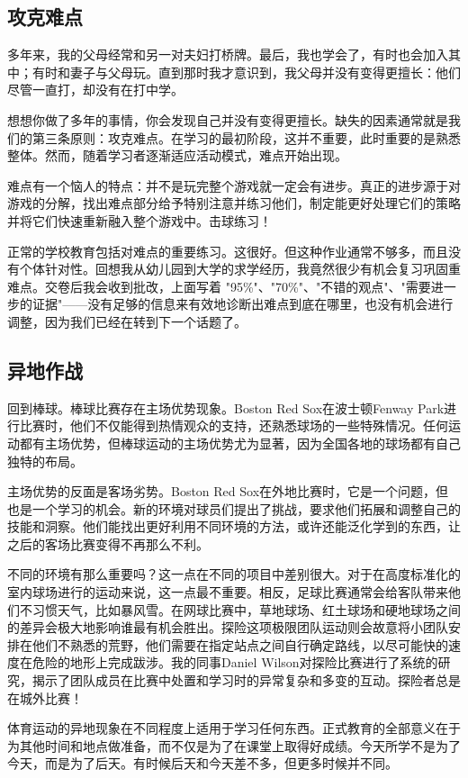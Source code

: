 \subsection*{攻克难点}
多年来，我的父母经常和另一对夫妇打桥牌。最后，我也学会了，有时也会加入其中；有时和妻子与父母玩。直到那时我才意识到，我父母并没有变得更擅长：他们尽管一直打，却没有在打中学。

想想你做了多年的事情，你会发现自己并没有变得更擅长。缺失的因素通常就是我们的第三条原则：攻克难点。在学习的最初阶段，这并不重要，此时重要的是熟悉整体。然而，随着学习者逐渐适应活动模式，难点开始出现。

难点有一个恼人的特点：并不是玩完整个游戏就一定会有进步。真正的进步源于对游戏的分解，找出难点部分给予特别注意并练习他们，制定能更好处理它们的策略并将它们快速重新融入整个游戏中。击球练习！

正常的学校教育包括对难点的重要练习。这很好。但这种作业通常不够多，而且没有个体针对性。回想我从幼儿园到大学的求学经历，我竟然很少有机会复习巩固重难点。交卷后我会收到批改，上面写着 "95\%"、"70\%"、"不错的观点"、"需要进一步的证据"——没有足够的信息来有效地诊断出难点到底在哪里，也没有机会进行调整，因为我们已经在转到下一个话题了。

\subsection*{异地作战}
回到棒球。棒球比赛存在主场优势现象。Boston Red Sox在波士顿Fenway Park进行比赛时，他们不仅能得到热情观众的支持，还熟悉球场的一些特殊情况。任何运动都有主场优势，但棒球运动的主场优势尤为显著，因为全国各地的球场都有自己独特的布局。

主场优势的反面是客场劣势。Boston Red Sox在外地比赛时，它是一个问题，但也是一个学习的机会。新的环境对球员们提出了挑战，要求他们拓展和调整自己的技能和洞察。他们能找出更好利用不同环境的方法，或许还能泛化学到的东西，让之后的客场比赛变得不再那么不利。

不同的环境有那么重要吗？这一点在不同的项目中差别很大。对于在高度标准化的室内球场进行的运动来说，这一点最不重要。相反，足球比赛通常会给客队带来他们不习惯天气，比如暴风雪。在网球比赛中，草地球场、红土球场和硬地球场之间的差异会极大地影响谁最有机会胜出。探险这项极限团队运动则会故意将小团队安排在他们不熟悉的荒野，他们需要在指定站点之间自行确定路线，以尽可能快的速度在危险的地形上完成跋涉。我的同事Daniel Wilson对探险比赛进行了系统的研究，揭示了团队成员在比赛中处置和学习时的异常复杂和多变的互动。探险者总是在城外比赛！

体育运动的异地现象在不同程度上适用于学习任何东西。正式教育的全部意义在于为其他时间和地点做准备，而不仅是为了在课堂上取得好成绩。今天所学不是为了今天，而是为了后天。有时候后天和今天差不多，但更多时候并不同。

